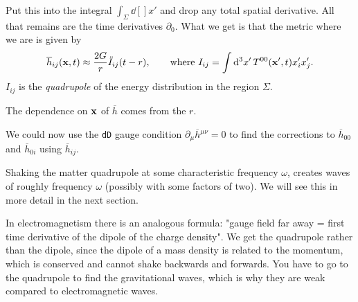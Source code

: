 Put this into the integral $\int_{\Sigma} \dd[]{x'}$  and drop any total spatial derivative.
All that remains are the time derivatives $\partial_0$. What we get is that the metric where we are is given by
\begin{equation}
  \overline{h}_{ij}(\vb{x}, t) \approx \frac{2G}{r} \ddot{I}_{ij}(t - r), \qquad \text{where } I_{ij} = \int \dd[3]{x'} T^{00} (\vb{x}', t) x'_{i} x'_{j}.
\end{equation}
$I_{ij}$ is the \emph{quadrupole} of the energy distribution in the region $\Sigma$.
\begin{leftbar}
  \begin{note}
    The dependence on $\vb{x}$ of $\overline{h}$ comes from the $r$.
  \end{note}
\end{leftbar}

\begin{remark}
  We could now use the \texttt{dD} gauge condition $\partial_{\mu} \overline{h}{}^{\mu\nu} = 0$ to find the corrections to $\overline{h}_{00}$ and $\overline{h}_{0i}$ using $\overline{h}_{ij}$.
\end{remark}

\begin{remark}
  Shaking the matter quadrupole at some characteristic frequency $\omega$, creates waves of roughly frequency $\omega$ (possibly with some factors of two).
  We will see this in more detail in the next section.
\end{remark}

\begin{leftbar}
  \begin{note}
    In electromagnetism there is an analogous formula: "gauge field far away = first time derivative of the dipole of the charge density".
    We get the quadrupole rather than the dipole, since the dipole of a mass density is related to the momentum, which is conserved and cannot shake backwards and forwards.
    You have to go to the quadrupole to find the gravitational waves, which is why they are weak compared to electromagnetic waves.
  \end{note}
\end{leftbar}

